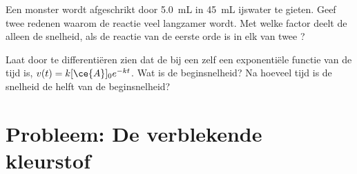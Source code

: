 \begin{exercise}[$\star\star\star$]\label{exo:g12:reaction-rates:14}
Een monster wordt afgeschrikt door \qty{5.0}{mL} in \qty{45}{mL} ijswater
te gieten. Geef twee redenen waarom de reactie veel langzamer wordt. Met
welke factor deelt de  alleen de snelheid, als de reactie van
de eerste orde is in elk van twee ?
\end{exercise}

\begin{exercise}[$\star\star\star$]\label{exo:g12:reaction-rates:15}
Laat door te differentiëren zien dat de  bij een
 zelf een exponentiële functie van de tijd is,
$v(t) = k[\ce{A}]_0 e^{-kt}$. Wat is de beginsnelheid? Na hoeveel tijd is
de snelheid de helft van de beginsnelheid?
\end{exercise}

\section{Probleem: De verblekende kleurstof}

